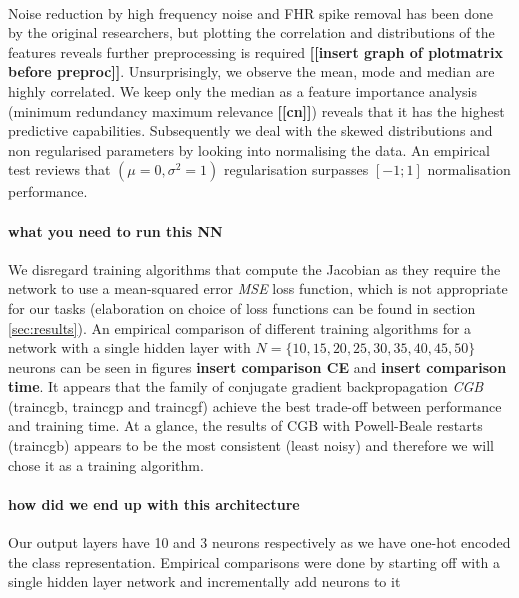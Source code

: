 \documentclass[11pt,a4paper]{article}
\begin{document}
\paragraph{}
Noise reduction by high frequency noise and FHR spike removal has been done by the original researchers, but plotting the correlation and distributions of the features reveals further preprocessing is required \textbf{[[insert graph of plotmatrix before preproc]]}. Unsurprisingly, we observe the mean, mode and median are highly correlated. We keep only the median as a feature importance analysis (minimum redundancy maximum relevance \textbf{[[cn]]}) reveals that it has the highest predictive capabilities. Subsequently we deal with the skewed distributions and non regularised parameters by looking into normalising the data. An empirical test reviews that \((\mu = 0, \sigma^2 = 1)\) regularisation surpasses \([-1;1]\) normalisation performance.

\paragraph{what you need to run this NN}
We disregard training algorithms that compute the Jacobian as they require the network to use a mean-squared error \textit{MSE} loss function, which is not appropriate for our tasks (elaboration on choice of loss functions can be found in section \ref{sec:results}). An empirical comparison of different training algorithms for a network with a single hidden layer with \(N = \{10,15,20,25,30,35,40,45,50\}\) neurons can be seen in figures \textbf{insert comparison CE} and \textbf{insert comparison time}. It appears that the family of conjugate gradient backpropagation \textit{CGB} (traincgb, traincgp and traincgf) achieve the best trade-off between performance and training time. At a glance, the results of CGB with Powell-Beale restarts (traincgb) appears to be the most consistent (least noisy) and therefore we will chose it as a training algorithm.
% 

\paragraph{how did we end up with this architecture}
Our output layers have 10 and 3 neurons respectively as we have one-hot encoded the class representation.
Empirical comparisons were done by starting off with a single hidden layer network and incrementally add neurons to it
\end{document}
